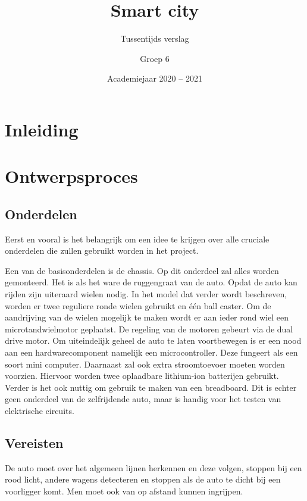 \documentclass[a4paper,twoside,kulak]{kulakreport} %
\title{Smart city}
\subtitle{Tussentijds verslag}
\author{Groep 6}
\institute{KU Leuven Kulak, Wetenschap \& Technologie}
\date{Academiejaar 2020 -- 2021}
\begin{document}

\titlepage

\tableofcontents

\section*{Inleiding}

\section{Ontwerpsproces}

\subsection{Onderdelen}

Eerst en vooral is het belangrijk om een idee te krijgen over alle cruciale onderdelen die zullen gebruikt worden in het project. 

Een van de basisonderdelen is de chassis. Op dit onderdeel zal alles worden gemonteerd. Het is als het ware de ruggengraat van de auto.%
Opdat de auto kan rijden zijn uiteraard wielen nodig. In het model dat verder wordt beschreven, worden er twee reguliere ronde wielen gebruikt en één ball caster. Om de aandrijving van de wielen mogelijk te maken wordt er aan ieder rond wiel een microtandwielmotor geplaatst. De regeling van de motoren gebeurt via de dual drive motor. Om uiteindelijk geheel de auto te laten voortbewegen is er een nood aan een hardwarecomponent namelijk een microcontroller. Deze fungeert als een soort mini computer. Daarnaast zal ook extra stroomtoevoer moeten worden voorzien. Hiervoor worden twee oplaadbare lithium-ion batterijen gebruikt. Verder is het ook nuttig om gebruik te maken van een breadboard. Dit is echter geen onderdeel van de zelfrijdende auto, maar is handig voor het testen van elektrische circuits.

\subsection{Vereisten} %
De auto moet over het algemeen lijnen herkennen en deze volgen, stoppen bij een rood licht, andere wagens detecteren en stoppen als de auto te dicht bij een voorligger komt. Men moet ook van op afstand kunnen ingrijpen.
\end{document}

